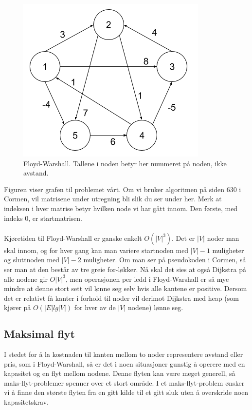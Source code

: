 \begin{figure}[H]
\includegraphics[scale=0.5]{images/floyd-warshall}
\centering %
\caption{Floyd-Warshall. Tallene i noden betyr her nummeret på noden, ikke avstand.}
\label{fig:floyd-warshall}
\end{figure}

\noindent Figuren viser grafen til problemet vårt. Om vi bruker algoritmen på siden 630 i Cormen, vil matrisene under utregning bli slik du ser under her. Merk at indeksen i hver matrise betyr hvilken node vi har gått innom. Den første, med indeks 0, er startmatrisen. 
\\\\
\noindent Kjøretiden til Floyd-Warshall er ganske enkelt $O(|V|^3)$. Det er $|V|$ noder man skal innom, og for hver gang kan man variere startnoden med $|V| - 1$ muligheter og sluttnoden med $|V| - 2$ muligheter. Om man ser på pseudokoden i Cormen, så ser man at den består av tre greie for-løkker. Nå skal det sies at også Dijkstra på alle nodene gir $O|V|^3$, men operasjonen per ledd i Floyd-Warshall er så mye mindre at denne stort sett vil lønne seg selv hvis alle kantene er positive. Dersom det er relativt få kanter i forhold til noder vil derimot Dijkstra med heap (som kjører på $O(|E| lg |V|)$ for hver av de $|V|$ nodene) lønne seg.

\subsection{Maksimal flyt}
I stedet for å la kostnaden til kanten mellom to noder representere avstand eller pris, som i Floyd-Warshall, så er det i noen situasjoner gunstig å operere med en kapasitet og en flyt mellom nodene. Denne flyten kan være meget generell, så maks-flyt-problemer spenner over et stort område. I et maks-flyt-problem ønsker vi å finne den største flyten fra en gitt kilde til et gitt sluk uten å overskride noen kapasitetskrav.

